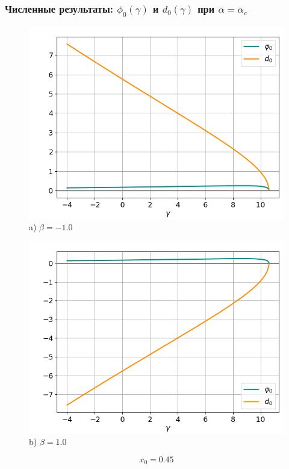 \documentclass[fullscreen=true, unicode, bookmarks=false]{beamer}
\begin{document}
\begin{frame}
\frametitle{ Численные результаты: $ \phi_0(\gamma) $ и $ d_0(\gamma) $ при $ \alpha=\alpha_c $ }

\begin{figure} 
\begin{minipage}[h]{0.49\linewidth}
\begin{center}
\includegraphics[scale=0.33]{oscillating_phi0d0_x0_045_beta_-1.png} \\ {\scriptsize a) $ \beta = -1.0 $}
\end{center}
\end{minipage} 
\hfill
\begin{minipage}[h]{0.49\linewidth}
\begin{center}
\includegraphics[scale=0.33]{oscillating_phi0d0_x0_045_beta_1.png}  \\ {\scriptsize b) $ \beta = 1.0 $}
\end{center}
\end{minipage} 
\end{figure}

$$ x_0 = 0.45 $$

\end{frame}
\end{document}
